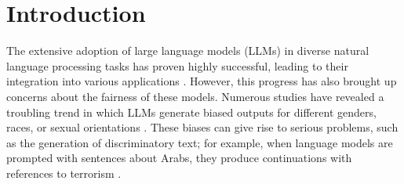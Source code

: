 \documentclass[letterpaper]{article} %
\newcommand{\goncalo}[1]
{\textcolor{orange}{{\bf}{\em #1}{\bf}}}
\begin{document}
\section{Introduction}


The extensive adoption of large language models (LLMs) in diverse natural language processing tasks has proven highly successful, leading to their integration into various applications \cite{liu2022brio,wang2018glue,rajpurkar2018know,rajpurkar2016squad,li2019unified,li2019dice,yu-etal-2020-named,ijcai2020p560}. However, this progress has also brought up concerns about the fairness of these models. Numerous studies have revealed a troubling trend in which LLMs generate biased outputs for different genders, races, or sexual orientations \cite{nadeem2021stereoset,meade2021empirical,zayed2022deep,zayed2023should}.
These biases can give rise to serious problems, such as the generation of discriminatory text; for example,  when language models are prompted with sentences about Arabs, they produce continuations with references to terrorism \cite{nadeem2021stereoset}.
\end{document}
